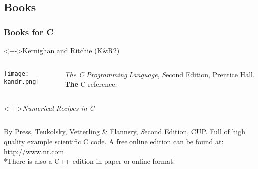 \documentclass[smaller,table]{beamer} %
\begin{document}
\subsection{Books}
\begin{frame}
\frametitle{Books for C}
\begin{block}<+->{Kernighan and Ritchie (K\&R2)}
\begin{columns}
\begin{column}{1.5cm}
\texttt{[image: kandr.png]}
\end{column}
\begin{column}{8cm}
\emph{The C Programming Language}, {\emph Second Edition},
Prentice Hall. \textbf{The} C reference.
\end{column}
\end{columns}
\end{block}

\begin{block}<+->{\emph{Numerical Recipes in C}}
\begin{columns}
\begin{column}{8cm}
By Press, Teukolsky, Vetterling \& Flannery, {\emph Second Edition}, CUP.
Full of high quality example scientific C code. A free online edition can be found at:
\url{http://www.nr.com}\\*There is also a C++ edition in paper or online format.
\end{column}
\end{columns}
\end{block}
\end{frame}
\end{document}

